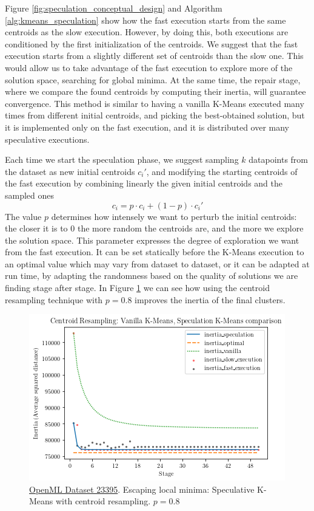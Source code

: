 Figure \ref{fig:speculation_conceptual_design} and Algorithm \ref{alg:kmeans_speculation} show how the fast execution starts from the same centroids as the slow execution. However, by doing this, both executions are conditioned by the first initialization of the centroids. We suggest that the fast execution starts from a slightly different set of centroids than the slow one. This would allow us to take advantage of the fast execution to explore more of the solution space, searching for global minima.  At the same time, the repair stage, where we compare the found centroids by computing their inertia, will guarantee convergence. This method is similar to having a vanilla K-Means executed many times from different initial centroids, and picking the best-obtained solution, but it is implemented only on the fast execution, and it is distributed over many speculative executions.

Each time we start the speculation phase, we suggest sampling $k$ datapoints from the dataset as new initial centroids $c_i'$, and modifying the starting centroids of the fast execution by combining linearly the given initial centroids and the sampled ones
\begin{equation}
c_i = p \cdot c_i + (1-p) \cdot c_i'
\end{equation} The value $p$ determines how intensely we want to perturb the initial centroids: the closer it is to $0$ the more random the centroids are, and the more we explore the solution space. This parameter expresses the degree of exploration we want from the fast execution. It can be set statically before the K-Means execution to an optimal value which may vary from dataset to dataset, or it can be adapted at run time, by adapting the randomness based on the quality of solutions we are finding stage after stage.
In Figure \ref{fig:vanilla_speculation_comparison_resampling} we can see how using the centroid resampling technique with $p = 0.8$ improves the inertia of the final clusters.
\begin{figure}[ht]
\centering
\includegraphics[width=\linewidth]{./plots/vanilla_speculation_comparison_resampling_centroids.png}
\caption{\href{https://www.openml.org/d/23395}{OpenML Dataset 23395}. Escaping local minima: Speculative K-Means with centroid resampling. $p = 0.8$}
\label{fig:vanilla_speculation_comparison_resampling}
\end{figure}


